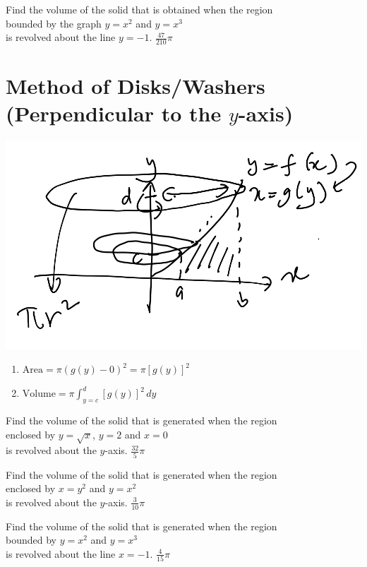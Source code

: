 \newpage
\problemans%
{Find the volume of the solid that is obtained when the region \\
	bounded by the graph $y=x^2$ and $y=x^3$ \\
	is revolved about the line $y=-1$. 
}%
{$\displaystyle \frac{47}{210}\pi$}%


\makenewpage
\section{Method of Disks/Washers (Perpendicular to the $y$-axis)}

\begin{myframe}[arc=10pt,auto outer arc]
	\centering
	\includegraphics[width=0.7\linewidth]{chapter5/discy}
	
	\begin{enumerate}
		\item $\displaystyle \textrm{Area} = \pi\left(g(y) - 0\right)^2 = \pi \left[g(y)\right]^2$
		\item $\displaystyle \textrm{Volume} = \pi \int_{y=c}^d \left[ g(y) \right]^2 \, dy$
	\end{enumerate}
	
\end{myframe}

\problemans%
{Find the volume of the solid that is generated when the region \\
	enclosed by $y=\sqrt{x}$, $y=2$ and $x=0$ \\
	is revolved about the $y$-axis. 
}%
{$\displaystyle \frac{32}{5}\pi$}%

\newpage
\problemans%
{Find the volume of the solid that is generated when the region \\
	enclosed by $x=y^2$ and $y=x^2$ \\
	is revolved about the $y$-axis.   
}%
{$\displaystyle \frac{3}{10}\pi$}%

\newpage
\problemans%
{Find the volume of the solid that is generated when the region \\ 
	bounded by $y=x^2$ and $y=x^3$\\
	is revolved about the line $x=-1$.  
}%
{$\displaystyle \frac{4}{15}\pi$}%






